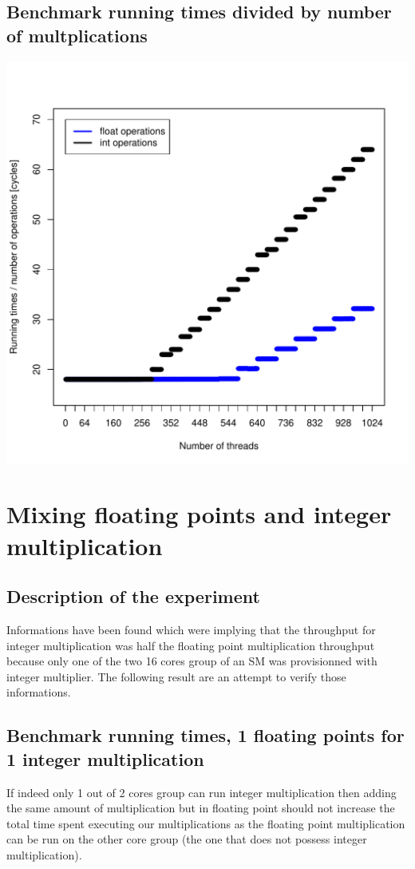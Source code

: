 \documentclass{article}
\begin{document}
	\subsection{Benchmark running times divided by number of multplications}
	\includegraphics[width=\linewidth]{"graphics/latency_estimate"}
	\pagebreak

\section{Mixing floating points and integer multiplication}
	\subsection{Description of the experiment}
	Informations have been found which were implying that the throughput for integer multiplication was half the floating point multiplication throughput because only one of the two 16 cores group of an SM was provisionned with integer multiplier.
	The following result are an attempt to verify those informations.
	\subsection{Benchmark running times, 1 floating points for 1 integer multiplication}
	If indeed only 1 out of 2 cores group can run integer multiplication then adding the same amount of multiplication but in floating point should not increase the total time spent executing our multiplications as the floating point multiplication can be run on the other core group (the one that does not possess integer multiplication).
	
\end{document}
